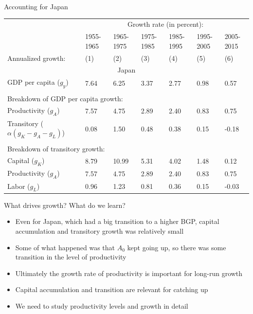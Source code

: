 \begin{frame}{Accounting for Japan}
\begin{scriptsize}
\begin{center}
\begin{tabularx}{\textwidth}{lXXXXXX}
\midrule
               & \multicolumn{6}{c}{Growth rate (in percent):} \\ \cmidrule(lr){2-7}
        & 1955-1965 & 1965-1975 & 1975-1985 & 1985-1995 & 1995-2005 & 2005-2015 \\
Annualized growth: & (1)       & (2)       & (3)       & (4)       & (5)       & (6)    \\
\midrule
%
\multicolumn{7}{c}{Japan} \\
GDP per capita ($g_y$) & 7.64 & 6.25 & 3.37 & 2.77 & 0.98 & 0.57\\
\\
\multicolumn{7}{l}{Breakdown of GDP per capita growth:} \\
Productivity ($g_A$) & 7.57 & 4.75 & 2.89 & 2.40 & 0.83 & 0.75\\
Transitory ($\alpha (g_K - g_A - g_L)$) & 0.08 & 1.50 & 0.48 & 0.38 & 0.15 & -0.18\\
\\
\multicolumn{7}{l}{Breakdown of transitory growth:} \\
Capital ($g_K$) & 8.79 & 10.99 & 5.31 & 4.02 & 1.48 & 0.12\\
Productivity ($g_A$) & 7.57 & 4.75 & 2.89 & 2.40 & 0.83 & 0.75\\
Labor ($g_L$) & 0.96 & 1.23 & 0.81 & 0.36 & 0.15 & -0.03\\

\midrule
\end{tabularx}
\end{center}
\end{scriptsize}
\end{frame}

\begin{frame}{What drives growth?}
What do we learn?
\begin{itemize}
	\item Even for Japan, which had a big transition to a higher BGP, capital accumulation and transitory growth was relatively small
	\item Some of what happened was that $A_0$ kept going up, so there was some transition in the level of productivity
	\item Ultimately the growth rate of productivity is important for long-run growth
	\item Capital accumulation and transition are relevant for catching up
	\item We need to study productivity levels and growth in detail
\end{itemize}
\end{frame}


